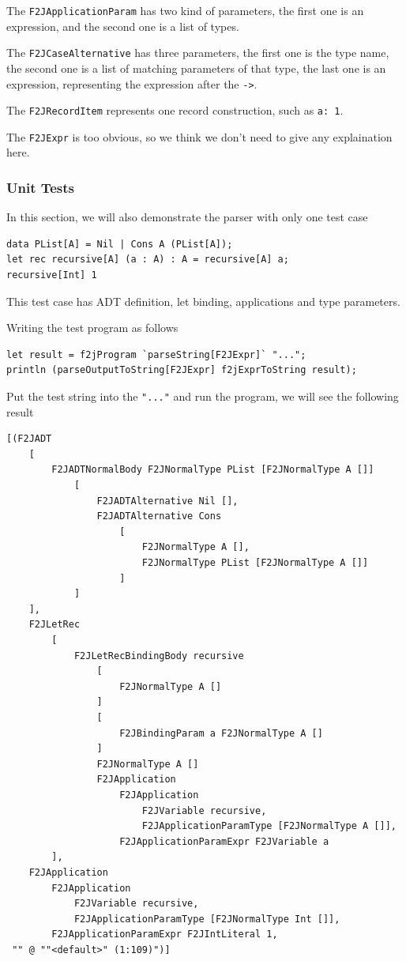 The \texttt{F2JApplicationParam} has two kind of parameters, the first one is an expression, and the second one is a list of types.

The \texttt{F2JCaseAlternative} has three parameters, the first one is the type name, the second one is a list of matching parameters of that type, the last one is an expression, representing the expression after the \texttt{-\textgreater}.

The \texttt{F2JRecordItem} represents one record construction, such as \texttt{a: 1}.

The \texttt{F2JExpr} is too obvious, so we think we don't need to give any explaination here.

\subsubsection{Unit Tests}

In this section, we will also demonstrate the parser with only one test case

\begin{lstlisting}
data PList[A] = Nil | Cons A (PList[A]);
let rec recursive[A] (a : A) : A = recursive[A] a;
recursive[Int] 1
\end{lstlisting}

This test case has ADT definition, let binding, applications and type parameters.

Writing the test program as follows

\begin{lstlisting}
let result = f2jProgram `parseString[F2JExpr]` "...";
println (parseOutputToString[F2JExpr] f2jExprToString result);
\end{lstlisting}

Put the test string into the \texttt{"..."} and run the program, we will see the following result

\begin{lstlisting}
[(F2JADT
    [
        F2JADTNormalBody F2JNormalType PList [F2JNormalType A []]
            [
                F2JADTAlternative Nil [],
                F2JADTAlternative Cons
                    [
                        F2JNormalType A [],
                        F2JNormalType PList [F2JNormalType A []]
                    ]
            ]
    ],
    F2JLetRec
        [
            F2JLetRecBindingBody recursive
                [
                    F2JNormalType A []
                ]
                [
                    F2JBindingParam a F2JNormalType A []
                ]
                F2JNormalType A []
                F2JApplication
                    F2JApplication
                        F2JVariable recursive,
                        F2JApplicationParamType [F2JNormalType A []],
                    F2JApplicationParamExpr F2JVariable a
        ],
    F2JApplication
        F2JApplication
            F2JVariable recursive,
            F2JApplicationParamType [F2JNormalType Int []],
        F2JApplicationParamExpr F2JIntLiteral 1,
 "" @ ""<default>" (1:109)")]
\end{lstlisting}

